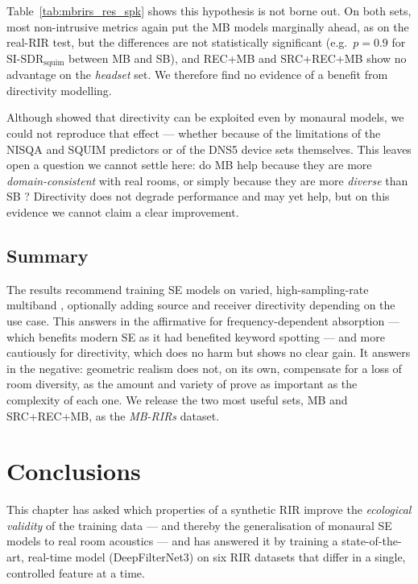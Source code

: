 Table~\ref{tab:mbrirs_res_spk} shows this hypothesis is not borne out.
On both sets, most non-intrusive metrics again put the MB models marginally
ahead, as on the real-\acrshort{RIR} test, but the differences are not
statistically significant (e.g.\ $p = 0.9$ for $\text{SI-SDR}_{\text{squim}}$
between MB and SB), and REC+MB and SRC+REC+MB show no advantage on the
\emph{headset} set. We therefore find no evidence of a benefit from directivity
modelling.

Although \citet{arakawa2024quantifying} showed that directivity can be exploited
even by monaural models, we could not reproduce that effect --- whether because
of the limitations of the NISQA and SQUIM predictors or of the \acrshort{DNS}5
device sets themselves. This leaves open a question we cannot settle here: do MB
 help because they are more \emph{domain-consistent} with real
rooms, or simply because they are more \emph{diverse} than SB \citep{jeon2024does}?
Directivity does not degrade performance and may yet help, but on this evidence
we cannot claim a clear improvement.

\subsection{Summary}
\label{ssec:mbrirs_res_summary}

The results recommend training \acrshort{SE} models on varied,
high-sampling-rate multiband , optionally adding source and
receiver directivity depending on the use case. This answers  in the
affirmative for frequency-dependent absorption --- which benefits modern
\acrshort{SE} as it had benefited keyword spotting --- and more cautiously for
directivity, which does no harm but shows no clear gain. It answers 
in the negative: geometric realism does not, on its own, compensate for a loss of
room diversity, as the amount and variety of  prove as important
as the complexity of each one. We release the two most useful sets, MB and
SRC+REC+MB, as the \emph{MB-RIRs}
dataset.

\section{Conclusions}
\label{sec:mbrirs_conclusions}

This chapter has asked which properties of a synthetic \acrshort{RIR} improve
the \emph{ecological validity} of the training data --- and thereby the
generalisation of monaural \acrshort{SE} models to real room acoustics --- and
has answered it by training a state-of-the-art, real-time model
(DeepFilterNet3) on six \acrshort{RIR} datasets that differ in a single,
controlled feature at a time.

